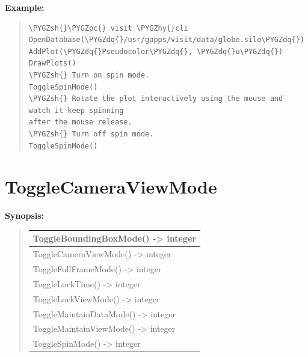 \documentclass[letterpaper,10pt,english]{sphinxmanual}
\def\PYGZsh{\char`\#}
\def\PYGZpc{\char`\%}
\def\PYGZhy{\char`\-}
\def\PYGZdq{\char`\"}
\begin{document}
\begin{DUlineblock}{0em}
\item[] \textbf{Example:}
\item[] 
\end{DUlineblock}
\begin{quote}

\begin{Verbatim}[commandchars=\\\{\}]
\PYGZsh{}\PYGZpc{} visit \PYGZhy{}cli
OpenDatabase(\PYGZdq{}/usr/gapps/visit/data/globe.silo\PYGZdq{})
AddPlot(\PYGZdq{}Pseudocolor\PYGZdq{}, \PYGZdq{}u\PYGZdq{})
DrawPlots()
\PYGZsh{} Turn on spin mode.
ToggleSpinMode()
\PYGZsh{} Rotate the plot interactively using the mouse and watch it keep spinning
after the mouse release.
\PYGZsh{} Turn off spin mode.
ToggleSpinMode()
\end{Verbatim}
\end{quote}


\section{ToggleCameraViewMode}
\label{functions:togglecameraviewmode}
\begin{DUlineblock}{0em}
\item[] \textbf{Synopsis:}
\end{DUlineblock}
\begin{quote}

\begin{tabulary}{\linewidth}{|L|}
\hline

ToggleBoundingBoxMode() -\textgreater{} integer
\\
\hline
ToggleCameraViewMode() -\textgreater{} integer
\\
\hline
ToggleFullFrameMode() -\textgreater{} integer
\\
\hline
ToggleLockTime() -\textgreater{} integer
\\
\hline
ToggleLockViewMode() -\textgreater{} integer
\\
\hline
ToggleMaintainDataMode() -\textgreater{} integer
\\
\hline
ToggleMaintainViewMode() -\textgreater{} integer
\\
\hline
ToggleSpinMode() -\textgreater{} integer
\\
\hline\end{tabulary}

\end{quote}
\end{document}

